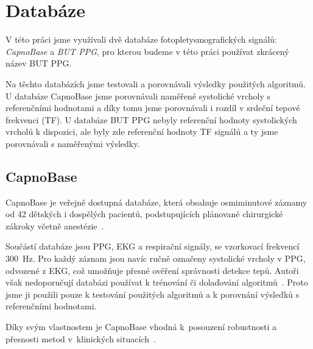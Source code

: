 \raggedbottom
\chapter{Databáze}
\label{chap:databaze}

V této práci jsme využívali dvě databáze fotopletysmografických signálů: \textit{CapnoBase} a \textit{\acl{BUT PPG}}, pro kterou budeme v této práci používat zkrácený název \acs{BUT PPG}.

Na těchto databázích jsme testovali a porovnávali výsledky použitých algoritmů.
U databáze CapnoBase jsme porovnávali naměřené systolické vrcholy s referenčními hodnotami a díky tomu jsme porovnávali i rozdíl v srdeční tepové frekvenci (\acs{TF}).
U databáze \acs{BUT PPG} nebyly referenční hodnoty systolických vrcholů k dispozici, ale byly zde referenční hodnoty \acs{TF} signálů a ty jsme porovnávali s naměřenými výsledky.

\section{CapnoBase}
\label{sec:capnobase}
CapnoBase je veřejně dostupná databáze, která obsahuje osmiminutové záznamy od 42 dětských i dospělých pacientů, podstupujících plánované chirurgické zákroky včetně anestézie~\cite{CapnoBase}.

Součástí databáze jsou \acs{PPG}, \acs{EKG} a respirační signály, se vzorkovací frekvencí 300~Hz.
Pro každý záznam jsou navíc ručně označeny systolické vrcholy v \acs{PPG}, odvozené z \acs{EKG}, což umožňuje přesné ověření správnosti detekce tepů.
Autoři však nedoporučují databázi používat k trénování či dolaďování algoritmů~\cite{CapnoBase}.
Proto jsme ji použili pouze k testování použitých algoritmů a k porovnání výsledků s referenčními hodnotami.

Díky svým vlastnostem je CapnoBase vhodná k~posouzení robustnosti a přesnosti metod v~klinických situacích~\cite{Karlen2013, Charlton2022}.

